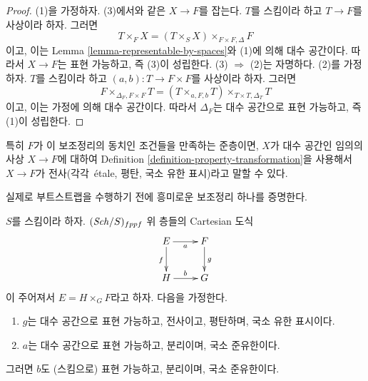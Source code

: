 \begin{proof}
(1)을 가정하자. (3)에서와 같은 $X \to F$를 잡는다. $T$를 스킴이라
하고 $T \to F$를 사상이라 하자. 그러면
$$
T \times_F X = (T \times_S X) \times_{F \times F, \Delta} F
$$
이고, 이는 Lemma \ref{lemma-representable-by-spaces}와 (1)에 의해
대수 공간이다. 따라서 $X \to F$는 표현 가능하고, 즉 (3)이 성립한다.
(3) $\Rightarrow$ (2)는 자명하다. (2)를 가정하자. $T$를 스킴이라 하고
$(a, b) : T \to F \times F$를 사상이라 하자. 그러면
$$
F \times_{\Delta_F, F \times F} T =
(T \times_{a, F, b} T) \times_{T \times T, \Delta_T} T
$$
이고, 이는 가정에 의해 대수 공간이다. 따라서 $\Delta_F$는 대수
공간으로 표현 가능하고, 즉 (1)이 성립한다.
\end{proof}

\noindent
특히 $F$가 이 보조정리의 동치인 조건들을 만족하는 준층이면,
$X$가 대수 공간인 임의의 사상 $X \to F$에 대하여
Definition \ref{definition-property-transformation}을 사용해서
$X \to F$가 전사(각각\ \'etale, 평탄, 국소 유한 표시)라고 말할 수 있다.

\medskip\noindent
실제로 부트스트랩을 수행하기 전에 흥미로운 보조정리 하나를 증명한다.

\begin{lemma}
\label{lemma-after-fppf-sep-lqf}
$S$를 스킴이라 하자. $(\mathit{Sch}/S)_{fppf}$ 위 층들의 Cartesian 도식
$$
\xymatrix{
E \ar[r]_a \ar[d]_f & F \ar[d]^g \\
H \ar[r]^b & G
}
$$
이 주어져서 $E = H \times_G F$라고 하자. 다음을 가정한다.
\begin{enumerate}
\item $g$는 대수 공간으로 표현 가능하고, 전사이고, 평탄하며, 국소
유한 표시이다.
\item $a$는 대수 공간으로 표현 가능하고, 분리이며, 국소 준유한이다.
\end{enumerate}
그러면 $b$도 (스킴으로) 표현 가능하고, 분리이며, 국소 준유한이다.
\end{lemma}

